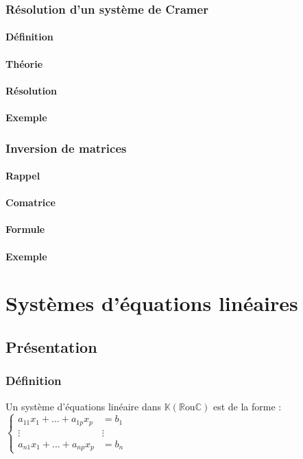 \documentclass[12pt,a4paper,french]{book}
\begin{document}
		\subsection{Résolution d'un système de Cramer}
			\subsubsection{Définition}
			\subsubsection{Théorie}
			\subsubsection{Résolution}
			\subsubsection{Exemple}
		\subsection{Inversion de matrices}
			\subsubsection{Rappel}
			\subsubsection{Comatrice}
			\subsubsection{Formule}
			\subsubsection{Exemple}
			
\chapter{Systèmes d'équations linéaires}
	\section{Présentation}
		\subsection{Définition}
			Un système d'équations linéaire dans $\mathbb{K} (\mathbb{R} \mbox{ou} \mathbb{C})$ est de la forme : \(\left\lbrace \begin{array}{ll}
				a_{11} x_1 + ... + a_{1p} x_p &=b_1 \\ \vdots & \vdots \\ a_{n1} x_1 + ... + a_{np} x_p &=b_n
			\end{array}\right.\)
			
\end{document}

